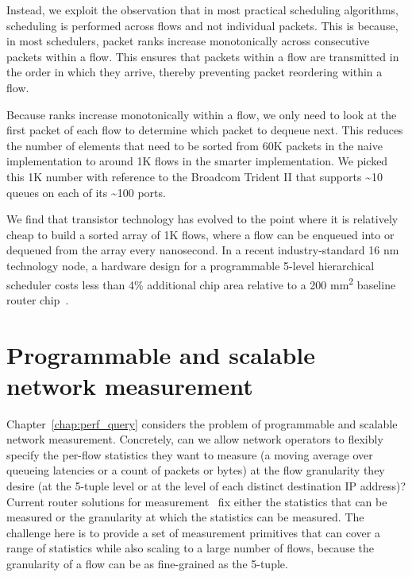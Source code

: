 Instead, we exploit the observation that in most practical scheduling
algorithms, scheduling is performed across flows and not individual packets.
This is because, in most schedulers, packet ranks increase monotonically across
consecutive packets within a flow. This ensures that packets within a flow are
transmitted in the order in which they arrive, thereby preventing packet
reordering within a flow.

Because ranks increase monotonically within a
flow, we only need to look at the first packet of each flow to determine which
packet to dequeue next. This reduces the number of elements that need to be
sorted from 60K packets in the naive implementation to around 1K flows in the
smarter implementation. We picked this 1K number with reference to the Broadcom
Trident II that supports \textasciitilde10 queues on each of its
\textasciitilde100 ports.

We find that transistor technology has evolved to the point where it is
relatively cheap to build a sorted array of 1K flows, where a flow can be
enqueued into or dequeued from the array every nanosecond. In a recent
industry-standard 16 nm technology node, a hardware design for a programmable
5-level hierarchical scheduler costs less than 4\% additional chip area
relative to a 200 \si{\milli\meter\squared} baseline router
chip~\cite{glen_parsing}.

\section{Programmable and scalable network measurement}
\label{s:intro_pq}

Chapter~\ref{chap:perf_query} considers the problem of programmable and
scalable network measurement. Concretely, can we allow network operators to
flexibly specify the per-flow statistics they want to measure (\eg a moving
average over queueing latencies or a count of packets or bytes) at the flow
granularity they desire (\eg at the 5-tuple level or at the level of each
distinct destination IP address)? Current router solutions for
measurement~\cite{netflow, tetration-telemetry} fix either the statistics that
can be measured or the granularity at which the statistics can be measured. The
challenge here is to provide a set of measurement primitives that can cover a
range of statistics while also scaling to a large number of flows, because the
granularity of a flow can be as fine-grained as the 5-tuple.

